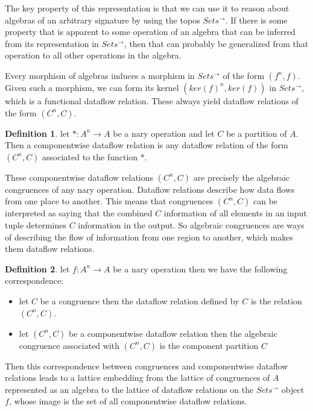 \documentclass[a4paper,11pt, notitlepage]{report}
\theoremstyle{definition}
\newtheorem{definition}{Definition}[section]
\begin{document}
The key property of this representation is that we can use it to reason about algebras of an arbitrary signature by using the topos $Sets^{\to}$. If there is some property that is apparent to some operation of an algebra that can be inferred from its representation in $Sets^{\to}$, then that can probably be generalized from that operation to all other operations in the algebra.

\newpage

Every morphism of algebras induces a morphism in $Sets^{\to}$ of the form $(f^n,f)$. Given such a morphism, we can form its kernel $(ker(f)^n, ker(f))$ in $Sets^{\to}$, which is a functional dataflow relation. These always yield dataflow relations of the form $(C^n, C)$.

\begin{definition}
let $*: A^n \to A$ be a nary operation and let $C$ be a partition of $A$. Then a componentwise dataflow relation is any dataflow relation of the form $(C^n,C)$ associated to the function $*$.
\end{definition}

These componentwise dataflow relations $(C^n, C)$ are precisely the algebraic congruences of any nary operation. Dataflow relations describe how data flows from one place to another. This means that congruences $(C^n,C)$ can be interpreted as saying that the combined $C$ information of all elements in an input tuple determines $C$ information in the output. So algebraic congruences are ways of describing the flow of information from one region to another, which makes them dataflow relations.

\begin{definition}
let $f: A^n \to A$ be a nary operation then we have the following correspondence:

\begin{itemize}
 \item let $C$ be a congruence then the dataflow relation defined by $C$ is the relation $(C^n,C)$.
 \item let $(C^n,C)$ be a componentwise dataflow relation then the algebraic congruence associated with $(C^n, C)$ is the component partition $C$
\end{itemize}
\end{definition}

Then this correspondence between congruences and componentwise dataflow relations leads to a lattice embedding from the lattice of congruences of $A$ represented as an algebra to the lattice of dataflow relations on the $Sets^{\to}$ object $f$, whose image is the set of all componentwise dataflow relations.
\end{document}
